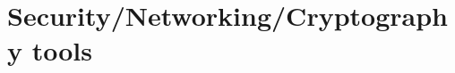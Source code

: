 \chapter{Security/Networking/Cryptography tools} %
\label{cha:Security/Networking/Cryptography tools}

